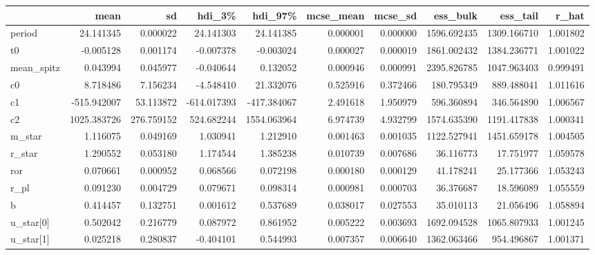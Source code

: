 \begin{tabular}{lrrrrrrrrr}
\toprule
{} &         mean &          sd &      hdi\_3\% &      hdi\_97\% &  mcse\_mean &   mcse\_sd &     ess\_bulk &     ess\_tail &     r\_hat \\
\midrule
period        &    24.141345 &    0.000022 &   24.141303 &    24.141385 &   0.000001 &  0.000000 &  1596.692435 &  1309.166710 &  1.001802 \\
t0            &    -0.005128 &    0.001174 &   -0.007378 &    -0.003024 &   0.000027 &  0.000019 &  1861.002432 &  1384.236771 &  1.001022 \\
mean\_spitz    &     0.043994 &    0.045977 &   -0.040644 &     0.132052 &   0.000946 &  0.000991 &  2395.826785 &  1047.963403 &  0.999491 \\
c0            &     8.718486 &    7.156234 &   -4.548410 &    21.332076 &   0.525916 &  0.372466 &   180.795349 &   889.488041 &  1.011616 \\
c1            &  -515.942007 &   53.113872 & -614.017393 &  -417.384067 &   2.491618 &  1.950979 &   596.360894 &   346.564890 &  1.006567 \\
c2            &  1025.383726 &  276.759152 &  524.682244 &  1554.063964 &   6.974739 &  4.932799 &  1574.635390 &  1191.417838 &  1.000341 \\
m\_star        &     1.116075 &    0.049169 &    1.030941 &     1.212910 &   0.001463 &  0.001035 &  1122.527941 &  1451.659178 &  1.004505 \\
r\_star        &     1.290552 &    0.053180 &    1.174544 &     1.385238 &   0.010739 &  0.007686 &    36.116773 &    17.751977 &  1.059578 \\
ror           &     0.070661 &    0.000952 &    0.068566 &     0.072198 &   0.000180 &  0.000129 &    41.178241 &    25.177366 &  1.053243 \\
r\_pl          &     0.091230 &    0.004729 &    0.079671 &     0.098314 &   0.000981 &  0.000703 &    36.376687 &    18.596089 &  1.055559 \\
b             &     0.414457 &    0.132751 &    0.001612 &     0.537689 &   0.038017 &  0.027553 &    35.010113 &    21.056496 &  1.058894 \\
u\_star[0]     &     0.502042 &    0.216779 &    0.087972 &     0.861952 &   0.005222 &  0.003693 &  1692.094528 &  1065.807933 &  1.001245 \\
u\_star[1]     &     0.025218 &    0.280837 &   -0.404101 &     0.544993 &   0.007357 &  0.006640 &  1362.063466 &   954.496867 &  1.001371 \\

\end{tabular}
